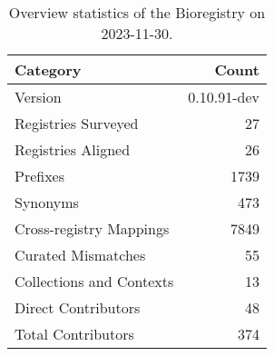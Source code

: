 \begin{table}
\caption{Overview statistics of the Bioregistry on 2023-11-30.}
\label{tab:bioregistry-summary}
\begin{tabular}{lr}
\toprule
Category & Count \\
\midrule
Version & 0.10.91-dev \\
Registries Surveyed & 27 \\
Registries Aligned & 26 \\
Prefixes & 1739 \\
Synonyms & 473 \\
Cross-registry Mappings & 7849 \\
Curated Mismatches & 55 \\
Collections and Contexts & 13 \\
Direct Contributors & 48 \\
Total Contributors & 374 \\
\bottomrule
\end{tabular}
\end{table}
